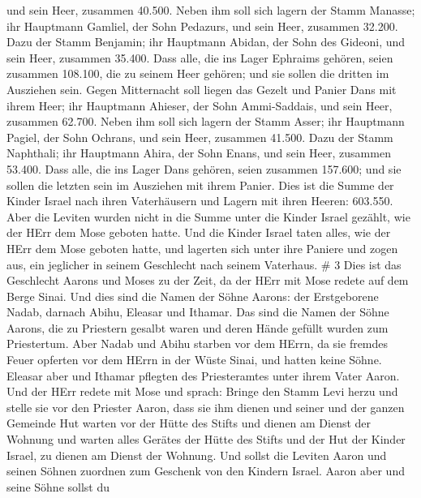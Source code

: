  und sein Heer, zusammen 40.500.  Neben ihm
soll sich lagern der Stamm Manasse; ihr Hauptmann Gamliel, der Sohn
Pedazurs,  und sein Heer, zusammen 32.200. 
Dazu der Stamm Benjamin; ihr Hauptmann Abidan, der Sohn des Gideoni,
 und sein Heer, zusammen 35.400.  Dass alle,
die ins Lager Ephraims gehören, seien zusammen 108.100, die zu seinem
Heer gehören; und sie sollen die dritten im Ausziehen sein.
 Gegen Mitternacht soll liegen das Gezelt und Panier Dans
mit ihrem Heer; ihr Hauptmann Ahieser, der Sohn Ammi-Saddais,
 und sein Heer, zusammen 62.700.  Neben ihm
soll sich lagern der Stamm Asser; ihr Hauptmann Pagiel, der Sohn
Ochrans,  und sein Heer, zusammen 41.500. 
Dazu der Stamm Naphthali; ihr Hauptmann Ahira, der Sohn Enans,
 und sein Heer, zusammen 53.400.  Dass alle,
die ins Lager Dans gehören, seien zusammen 157.600; und sie sollen die
letzten sein im Ausziehen mit ihrem Panier.  Dies ist die
Summe der Kinder Israel nach ihren Vaterhäusern und Lagern mit ihren
Heeren: 603.550.  Aber die Leviten wurden nicht in die
Summe unter die Kinder Israel gezählt, wie der HErr dem Mose geboten
hatte.  Und die Kinder Israel taten alles, wie der HErr dem
Mose geboten hatte, und lagerten sich unter ihre Paniere und zogen aus,
ein jeglicher in seinem Geschlecht nach seinem Vaterhaus. \# 3
 Dies ist das Geschlecht Aarons und Moses zu der Zeit, da
der HErr mit Mose redete auf dem Berge Sinai.  Und dies sind
die Namen der Söhne Aarons: der Erstgeborene Nadab, darnach Abihu,
Eleasar und Ithamar.  Das sind die Namen der Söhne Aarons,
die zu Priestern gesalbt waren und deren Hände gefüllt wurden zum
Priestertum.  Aber Nadab und Abihu starben vor dem HErrn, da
sie fremdes Feuer opferten vor dem HErrn in der Wüste Sinai, und hatten
keine Söhne. Eleasar aber und Ithamar pflegten des Priesteramtes unter
ihrem Vater Aaron.  Und der HErr redete mit Mose und sprach:
 Bringe den Stamm Levi herzu und stelle sie vor den Priester
Aaron, dass sie ihm dienen  und seiner und der ganzen
Gemeinde Hut warten vor der Hütte des Stifts und dienen am Dienst der
Wohnung  und warten alles Gerätes der Hütte des Stifts und
der Hut der Kinder Israel, zu dienen am Dienst der Wohnung. 
Und sollst die Leviten Aaron und seinen Söhnen zuordnen zum Geschenk von
den Kindern Israel.  Aaron aber und seine Söhne sollst du
